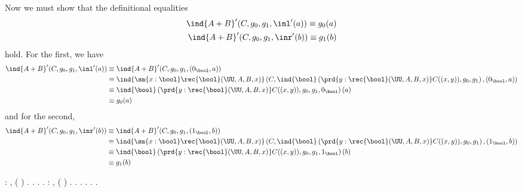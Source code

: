 Now we must show that the definitional equalities
\begin{align*}
\ind{A+B}'(C, g_{0}, g_{1}, \inl'(a)) \equiv g_{0}(a) \\
\ind{A+B}'(C, g_{0}, g_{1}, \inr'(b)) \equiv g_{1}(b)
\end{align*}
hold.  For the first, we have
\begin{align*}
\ind{A+B}'(C, g_{0}, g_{1}, \inl'(a)) 
&\equiv
\ind{A+B}'(C, g_{0}, g_{1}, (0_{\bool}, a)) 
\\&\equiv
\ind{\sm{x:\bool}\rec{\bool}(\UU, A, B, x)}\left(
C,
\ind{\bool}\left(
\prd{y:\rec{\bool}(\UU, A, B, x)} C((x, y)),
g_{0},
g_{1}
\right),
(0_{\bool}, a)
\right)
\\&\equiv
\ind{\bool}\left(
\prd{y:\rec{\bool}(\UU, A, B, x)} C((x, y)),
g_{0},
g_{1},
0_{\bool}
\right)(a)
\\&\equiv
g_{0}(a)
\end{align*}
and for the second,
\begin{align*}
\ind{A+B}'(C, g_{0}, g_{1}, \inr'(b)) 
&\equiv
\ind{A+B}'(C, g_{0}, g_{1}, (1_{\bool}, b)) 
\\&\equiv
\ind{\sm{x:\bool}\rec{\bool}(\UU, A, B, x)}\left(
C,
\ind{\bool}\left(
\prd{y:\rec{\bool}(\UU, A, B, x)} C((x, y)),
g_{0},
g_{1}
\right),
(1_{\bool}, b)
\right)
\\&\equiv
\ind{\bool}\left(
\prd{y:\rec{\bool}(\UU, A, B, x)} C((x, y)),
g_{0},
g_{1},
1_{\bool}
\right)(b)
\\&\equiv
g_{1}(b)
\end{align*} \begin{coqdoccode}
\coqdocemptyline
\coqdocnoindent
{}  : \coqdoceol
\coqdocindent{1.00em}
\coqdockw{\ensuremath{\forall}}    ,     ( ) \coqdocnotation{=}  .\coqdoceol
\coqdocnoindent
{}.\coqdoceol
\coqdocindent{1.00em}
.\coqdoceol
\coqdocnoindent
{}.\coqdoceol
\coqdocemptyline
\coqdocnoindent
{}  : \coqdoceol
\coqdocindent{1.00em}
\coqdockw{\ensuremath{\forall}}    ,     ( ) \coqdocnotation{=}  .\coqdoceol
\coqdocnoindent
{}.\coqdoceol
\coqdocindent{1.00em}
.\coqdoceol
\coqdocnoindent
{}.\coqdoceol
\coqdocemptyline
\coqdocnoindent
{} .\coqdoceol
\coqdocnoindent
{} .\coqdoceol
\coqdocemptyline
\end{coqdoccode}
